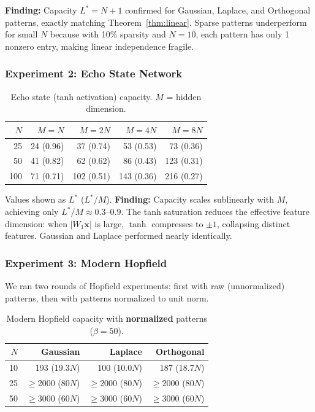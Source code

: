 \documentclass[11pt]{article}
\theoremstyle{definition}
\theoremstyle{remark}
\begin{document}
\textbf{Finding:} Capacity $L^* = N + 1$ confirmed for Gaussian, Laplace, and Orthogonal patterns, exactly matching Theorem~\ref{thm:linear}. Sparse patterns underperform for small $N$ because with 10\% sparsity and $N=10$, each pattern has only 1 nonzero entry, making linear independence fragile.

\subsubsection{Experiment 2: Echo State Network}

\begin{table}[h]
\centering
\caption{Echo state (tanh activation) capacity. $M$ = hidden dimension.}
\begin{tabular}{r r r r r}
\toprule
$N$ & $M = N$ & $M = 2N$ & $M = 4N$ & $M = 8N$ \\
\midrule
25  & 24 (0.96) & 37 (0.74) & 53 (0.53) & 73 (0.36) \\
50  & 41 (0.82) & 62 (0.62) & 86 (0.43) & 123 (0.31) \\
100 & 71 (0.71) & 102 (0.51) & 143 (0.36) & 216 (0.27) \\
\bottomrule
\end{tabular}
\label{tab:echo}
\end{table}

Values shown as $L^*$ ($L^*/M$). \textbf{Finding:} Capacity scales sublinearly with $M$, achieving only $L^*/M \approx 0.3$--$0.9$. The tanh saturation reduces the effective feature dimension: when $|W_1 \mathbf{x}|$ is large, $\tanh$ compresses to $\pm 1$, collapsing distinct features. Gaussian and Laplace performed nearly identically.

\subsubsection{Experiment 3: Modern Hopfield}

We ran two rounds of Hopfield experiments: first with raw (unnormalized) patterns, then with patterns normalized to unit norm.

\begin{table}[h]
\centering
\caption{Modern Hopfield capacity with \textbf{normalized} patterns ($\beta = 50$).}
\begin{tabular}{r r r r}
\toprule
$N$ & Gaussian & Laplace & Orthogonal \\
\midrule
10  & 193 (19.3$N$) & 100 (10.0$N$) & 187 (18.7$N$) \\
25  & $\geq$2000 (80$N$) & $\geq$2000 (80$N$) & $\geq$2000 (80$N$) \\
50  & $\geq$3000 (60$N$) & $\geq$3000 (60$N$) & $\geq$3000 (60$N$) \\
\bottomrule
\end{tabular}
\label{tab:hopfield_norm}
\end{table}
\end{document}
